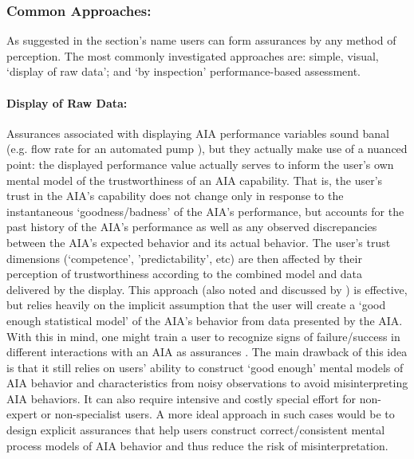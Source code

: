 \subsubsection{Common Approaches:}
As suggested in the section's name users can form assurances by any method of perception. The most commonly investigated approaches are: simple, visual, `display of raw data'; and `by inspection' performance-based assessment. 

\paragraph{Display of Raw Data:}
Assurances associated with displaying AIA performance variables sound banal (e.g. flow rate for an automated pump \cite{Muir1996-gt}), but they actually make use of a nuanced point: the displayed performance value actually serves to inform the user's own mental model of the trustworthiness of an AIA capability. That is, the user's trust in the AIA's capability does not change only in response to the instantaneous `goodness/badness' of the AIA's performance, but accounts for the past history of the AIA's performance as well as any observed discrepancies between the AIA's expected behavior and its actual behavior. The user's trust dimensions (`competence', 'predictability', etc) are then affected by their perception of trustworthiness according to the combined model and data delivered by the display. This approach (also noted and discussed by \cite{Wickens1999-la,Sheridan1984-kx,Hutchins2015-if}) is effective, but relies heavily on the implicit assumption that the user will create a `good enough statistical model' of the AIA's behavior from data presented by the AIA. With this in mind, one might train a user to recognize signs of failure/success in different interactions with an AIA as assurances \cite{Freedy2007-sg,Desai2012-rc,Salem2015-md}. The main drawback of this idea is that it still relies on users' ability to construct `good enough' mental models of AIA behavior and characteristics from noisy observations to avoid misinterpreting AIA behaviors. It can also require intensive and costly special effort for non-expert or non-specialist users. A more ideal approach in such cases would be to design explicit assurances that help users construct correct/consistent mental process models of AIA behavior and thus reduce the risk of misinterpretation.

